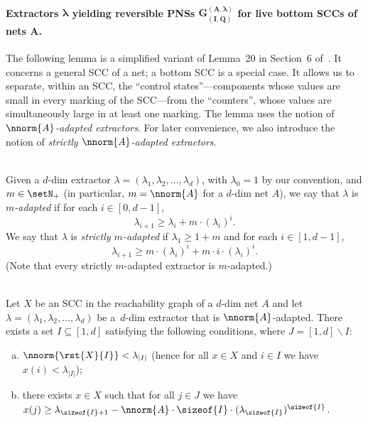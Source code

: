 \paragraph{Extractors $\bm{\lambda}$ yielding reversible PNSs
$\bm{G^{(A,\lambda)}_{(I,Q)}}$ for
live bottom SCCs of nets $\bm{A}$.}

The following lemma is a simplified variant of Lemma~20 in
Section~6 of~\cite{DBLP:conf/fsttcs/Leroux19}. It concerns a general
SCC of a net; a bottom SCC 
is a special case. It allows us to separate, within an SCC, the
``control states''---components whose values are small in every marking
of the SCC---from the ``counters'', whose values are simultaneously
large in at least one marking.
The lemma uses the notion of \emph{$\nnorm{A}$-adapted
extractors}. For later convenience, we also introduce the notion of
\emph{strictly $\nnorm{A}$-adapted
extractors}.

\begin{defi}\label{def:Aadaptextract}
\hfill\\
	Given a $d$-dim extractor
	$\lambda=(\lambda_1,\lambda_2,\dots,\lambda_d)$, with
	$\lambda_0=1$ by our convention,
	and
	$m\in\setN_+$ (in particular, $m=\nnorm{A}$ for a $d$-dim net
	$A$), we say that $\lambda$ is \emph{$m$-adapted}
if  for each
	$i\in[0,d{-}1]$,
	\[\lambda_{i+1}\geq \lambda_i+m\cdot (\lambda_i)^i.\]
	 We say that $\lambda$ is  \emph{strictly
	$m$-adapted} if $\lambda_1\geq 1+m$ and
	for each
	$i\in[1,d{-}1]$,
	\begin{equation}\label{eq:genextr}
		\lambda_{i+1}\geq m\cdot (\lambda_i)^i+m\cdot
	i\cdot(\lambda_i)^i.
	\end{equation}
	(Note that every strictly $m$-adapted extractor is $m$-adapted.)
\end{defi}


\begin{lemC}\label{lem:sccfirst}
\hfill\\
	Let $X$ be an SCC in the reachability graph of a $d$-dim net $A$ 
 and
	let
	$\lambda=(\lambda_1,\lambda_2,\dots,\lambda_d)$ be a~$d$-dim
	extractor that is $\nnorm{A}$-adapted. 
	There exists a 
	set $I\subseteq[1,d]$
	satisfying the following conditions, where
	$J=[1,d]\smallsetminus I$:
	\begin{enumerate}[a)]	
\item
	$\nnorm{\rst{X}{I}}<\lambda_{|I|}$ (hence for all $x\in X$ and
			$i\in I$ we have $x(i)<\lambda_{|I|}$);			
\item
there exists			$x\in X$
such that for all $j\in J$ we have
		$x(j)\geq
		\lambda_{\sizeof{I}+1}-\nnorm{A}\cdot\sizeof{I}\cdot(\lambda_{\sizeof{I}})^{\sizeof{I}}$.
	\end{enumerate}
\end{lemC}


